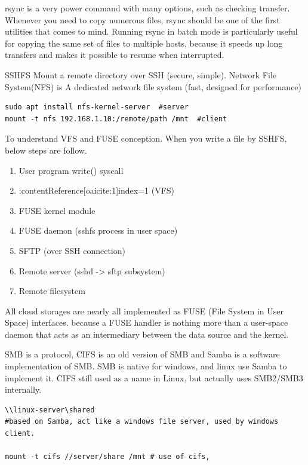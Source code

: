 \documentclass[paper=8.5in:11in, twoside, 12pt, pagesize=pdftex]{book}
\begin{document}
	\par rsync is a very power command with many options, such as checking transfer. Whenever you need to copy numerous files, rsync should be one of the first utilities that comes to mind. Running rsync in batch mode is particularly useful for copying the same set of files to multiple hosts, because it speeds up long transfers and makes it possible to resume when interrupted.
	
	\par SSHFS Mount a remote directory over SSH (secure, simple). Network File System(NFS) is A dedicated network file system (fast, designed for performance)
\begin{lstlisting}
sudo apt install nfs-kernel-server  #server
mount -t nfs 192.168.1.10:/remote/path /mnt  #client
\end{lstlisting}	

	\par To understand VFS and FUSE conception. When you write a file by SSHFS, below steps are follow. 
\begin{enumerate}
\item User program write() syscall
\item :contentReference[oaicite:1]{index=1} (VFS)
\item FUSE kernel module
\item FUSE daemon (sshfs process in user space)
\item SFTP (over SSH connection)
\item Remote server (sshd -> sftp subsystem)
\item Remote filesystem
\end{enumerate}

	\par All cloud storages are nearly all implemented as FUSE (File System in User Space) interfaces. because a FUSE handler is nothing more than a user-space daemon that acts as an intermediary between the data source and the kernel.
	
	\par SMB is a protocol, CIFS is an old version of SMB and Samba is a software implementation of SMB. SMB is native for windows, and linux use Samba to implement it. CIFS still used as a name in Linux, but actually uses SMB2/SMB3 internally. 
\begin{lstlisting}
\\linux-server\shared 
#based on Samba, act like a windows file server, used by windows client.

mount -t cifs //server/share /mnt # use of cifs, 
\end{lstlisting}
\end{document}
